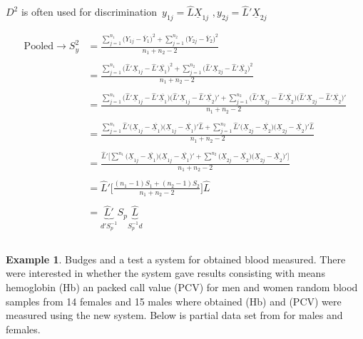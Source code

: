 \documentclass[11pt,a4paper]{article}
\theoremstyle{definition}
\newtheorem{exa}[thm]{Example}
\begin{document}
$D^2$ is often used for discrimination \,$y_{1j}=\widehat{L}\underline{X}_{1j}$  $,  y_{2j}=\widehat{L}'\underline{X}_{2j}$


\begin{align*}
\text{Pooled}\rightarrow S^2_y & = \frac{\sum\limits^{n_1}_{j=1}\big(Y_{1j}-\overline{Y}_1\big)^2 + \sum\limits^{n_2}_{j=1}\big(Y_{2j}-\overline{Y}_2\big)^2}{n_1+n_2-2}\\\\
& = \frac{\sum\limits^{n_1}_{j=1}\Big(\widehat{L}'\underline{X}_{1j}-\widehat{L}'\overline{\underline{X}_1}\Big)^2 + \sum\limits^{n_2}_{j=1}\Big(\widehat{L}'\underline{X}_{2j}-\widehat{L}'\overline{\underline{X}_2}\Big)^2}{n_1+n_2-2}\\\\
& = \frac{\sum\limits^{n_1}_{j=1}\big(\widehat{L}'\underline{X}_{1j}-\widehat{L}'\overline{\underline{X}_1}\big)\big(\widehat{L}'\underline{X}_{1j}-\widehat{L}'\overline{\underline{X}_2}\big)' + \sum\limits^{n_2}_{j=1}\big(\widehat{L}'\underline{X}_{2j}-\widehat{L}'\overline{\underline{X}_2}\big)\big(\widehat{L}'\underline{X}_{2j}-\widehat{L}'\overline{\underline{X}_2}\big)'}{n_1 + n_2 -2}\\\\
& = \frac{\sum\limits^{n_1}_{j=1}\widehat{L}'\big(\underline{X}_{1j}-\overline{\underline{X}_1}\big)\big(\underline{X}_{1j}-\overline{\underline{X}_1}\big)'\widehat{L}+ \sum\limits^{n_2}_{j=1}\widehat{L}'\big(\underline{X}_{2j}-\overline{\underline{X}_2}\big)\big(\underline{X}_{2j}-\overline{\underline{X}_2}\big)'\widehat{L}}{n_1 + n_2 - 2}\\\\
& = \frac{\widehat{L}'\Big[\sum\limits^{n_1}\big(\underline{X}_{1j}-\overline{\underline{X}_1}\big)\big(\underline{X}_{1j}-\overline{\underline{X}_1}\big)' + \sum\limits^{n_2}\big(\underline{X}_{2j}-\overline{\underline{X}_2}\big)\big(\underline{X}_{2j}-\overline{\underline{X}_2}\big)'\Big]}{n_1 + n_2 -2}\\\\
& = \widehat{L}'\Bigg[\frac{(n_1-1)S_1 + (n_2-1)S_2}{n_1 + n_2 -2}\Bigg]\widehat{L}\\\\
& = \underbrace{\widehat{L}'}_{d'S^{-1}_p} S_p \underbrace{\widehat{L}}_{S^{-1}_pd}\\\\
\end{align*}




\begin{exa}
Budges and a test a system for obtained blood measured.
There were interested in whether the system gave results consisting with means hemoglobin (Hb) an packed call value (PCV) for men and women random blood samples from 14 females and 15 males where obtained (Hb) and (PCV) were measured using the new system. Below is partial data set from for males and females.
\end{exa}
\end{document}
